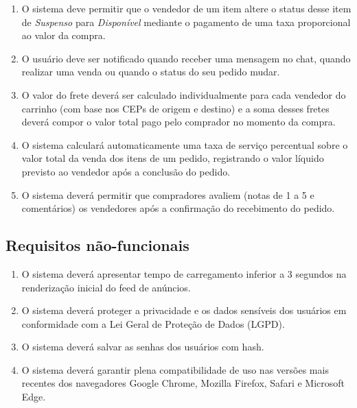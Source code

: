 ﻿\documentclass[12pt,a4paper]{article}
\begin{document}
\begin{enumerate}[label=RF\arabic*:]
    \item O sistema deve permitir que o vendedor de um item altere o status desse item de \textit{Suspenso} para \textit{Disponível} mediante o pagamento de uma taxa proporcional ao valor da compra.

    \item O usuário deve ser notificado quando receber uma mensagem no chat, quando realizar uma venda ou quando o status do seu pedido mudar.

    \item O valor do frete deverá ser calculado individualmente para cada vendedor do carrinho (com base nos CEPs de origem e destino) e a soma desses fretes deverá compor o valor total pago pelo comprador no momento da compra.

     \item O sistema calculará automaticamente uma taxa de serviço percentual sobre o valor total da venda dos itens de um pedido, registrando o valor líquido previsto ao vendedor após a conclusão do pedido.

     \item O sistema deverá permitir que compradores avaliem (notas de 1 a 5 e comentários) os vendedores após a confirmação do recebimento do pedido.

\end{enumerate}

\subsection{Requisitos não-funcionais}
\label{sec:RequisitosNaoFuncionais}

\begin{enumerate}[label=RNF\arabic*:]

    \item O sistema deverá apresentar tempo de carregamento inferior a 3 segundos na renderização inicial do feed de anúncios.

    \item O sistema deverá proteger a privacidade e os dados sensíveis dos usuários em conformidade com a Lei Geral de Proteção de Dados (LGPD).

    \item O sistema deverá salvar as senhas dos usuários com hash.

    \item O sistema deverá garantir plena compatibilidade de uso nas versões mais recentes dos navegadores Google Chrome, Mozilla Firefox, Safari e Microsoft Edge.

\end{enumerate}
\end{document}
